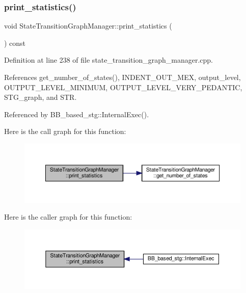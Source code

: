 \subsubsection{\texorpdfstring{print\+\_\+statistics()}{print\_statistics()}}
{\footnotesize\ttfamily void State\+Transition\+Graph\+Manager\+::print\+\_\+statistics (\begin{DoxyParamCaption}{ }\end{DoxyParamCaption}) const}



Definition at line 238 of file state\+\_\+transition\+\_\+graph\+\_\+manager.\+cpp.



References get\+\_\+number\+\_\+of\+\_\+states(), I\+N\+D\+E\+N\+T\+\_\+\+O\+U\+T\+\_\+\+M\+EX, output\+\_\+level, O\+U\+T\+P\+U\+T\+\_\+\+L\+E\+V\+E\+L\+\_\+\+M\+I\+N\+I\+M\+UM, O\+U\+T\+P\+U\+T\+\_\+\+L\+E\+V\+E\+L\+\_\+\+V\+E\+R\+Y\+\_\+\+P\+E\+D\+A\+N\+T\+IC, S\+T\+G\+\_\+graph, and S\+TR.



Referenced by B\+B\+\_\+based\+\_\+stg\+::\+Internal\+Exec().

Here is the call graph for this function\+:
\nopagebreak
\begin{figure}[H]
\begin{center}
\leavevmode
\includegraphics[width=350pt]{d9/dfd/classStateTransitionGraphManager_ab58c3818c8f95a5184b14abc1df67219_cgraph}
\end{center}
\end{figure}
Here is the caller graph for this function\+:
\nopagebreak
\begin{figure}[H]
\begin{center}
\leavevmode
\includegraphics[width=350pt]{d9/dfd/classStateTransitionGraphManager_ab58c3818c8f95a5184b14abc1df67219_icgraph}
\end{center}
\end{figure}
\mbox{\label{classStateTransitionGraphManager_aece975a4f5bcb162267993d933d25945}} 
